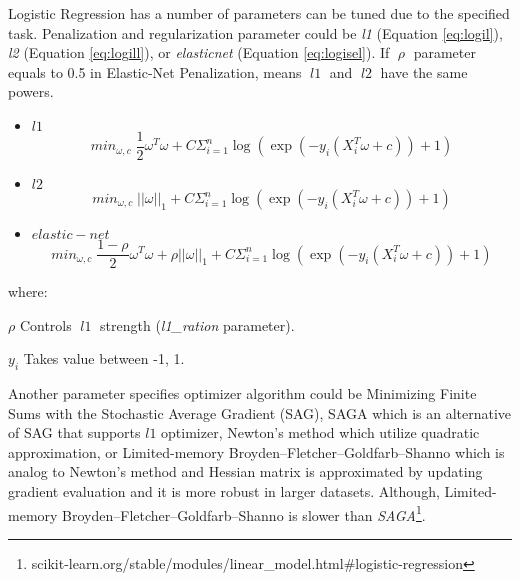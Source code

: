 Logistic Regression has a number of parameters can be tuned due to the specified task. Penalization and regularization parameter could be \textit{l1} (Equation \ref{eq:logil}), \textit{l2} (Equation \ref{eq:logill}), or \textit{elasticnet} (Equation \ref{eq:logisel}). If $\; \rho \;$ parameter equals to 0.5 in Elastic-Net Penalization, means $\;l1\;$ and $\;l2\;$ have the same powers. 
\begin{itemize}
	
	\item $l1$
	\begin{equation}
	\label{eq:logil}
	min_{\omega,c} \; \frac{1}{2}\omega^{T}\omega + C \Sigma_{i=1}^{n} \log\left(\exp\left(-y_{i}\left(X^{T}_{i}\omega + c \right)\right) + 1 \right)
	\end{equation}
	\item $l2$
	\begin{equation}
	\label{eq:logill}
	min_{\omega,c} \; \left|\left|\omega\right|\right|_{1} + C \Sigma_{i=1}^{n} \log\left(\exp\left(-y_{i}\left(X^{T}_{i}\omega + c \right)\right) + 1 \right) 
	\end{equation}
	
	\item $elastic-net$
	\begin{equation}
	\label{eq:logisel}
	min_{\omega,c} \; \frac{1-\rho}{2}\omega^{T}\omega +\rho\left|\left|\omega\right|\right|_{1} + C \Sigma_{i=1}^{n} \log\left(\exp\left(-y_{i}\left(X^{T}_{i}\omega + c \right)\right) + 1 \right) 
	\end{equation}
	
\end{itemize}
where:
\begin{eqexpl}[25mm]
	\item{$\rho$} Controls $\; l1 \;$ strength (\textit{l1\_ration} parameter).
	\item{$y_{i}$} Takes value between -1, 1.
\end{eqexpl}
\bigbreak
Another parameter specifies optimizer algorithm could be Minimizing Finite Sums with the Stochastic Average Gradient (SAG), SAGA which is an alternative of SAG that supports $l1$ optimizer,  Newton’s method which utilize quadratic approximation, or Limited-memory Broyden–Fletcher–Goldfarb–Shanno which is analog to Newton's method and Hessian matrix is approximated by updating gradient evaluation and it is more robust in larger datasets. Although, Limited-memory Broyden–Fletcher–Goldfarb–Shanno is slower than \textit{SAGA}\footnote{scikit-learn.org/stable/modules/linear\_model.html\#logistic-regression}.

